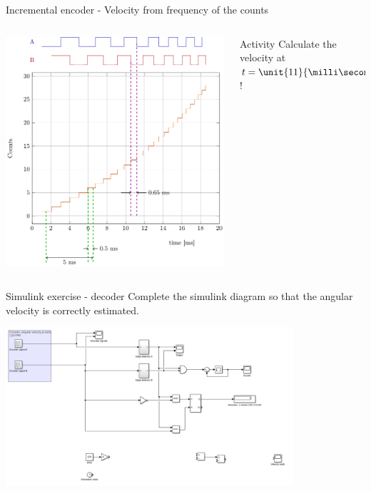 \documentclass[presentation,aspectratio=169]{beamer}
\begin{document}
\begin{frame}[label={sec:org1d4434c}]{Incremental encoder - Velocity from frequency of the counts}
\begin{columns}
\begin{column}{0.5\columnwidth}
\begin{center}
\includegraphics[width=\textwidth]{../../figures/encoder-signals-nonuniform}
\end{center}
\end{column}
\begin{column}{0.5\columnwidth}
\alert{Activity} Calculate the velocity at \(t=\unit{11}{\milli\second}\)!
\end{column}
\end{columns}
\end{frame}






\begin{frame}[label={sec:orgd607c34}]{Simulink exercise - decoder}
Complete the simulink diagram so that the angular velocity is correctly estimated.

\begin{center}
\includegraphics[width=0.8\textwidth]{../../figures/simulink-encoder-decoder-exc.png}
\end{center}
\end{frame}
\end{document}
